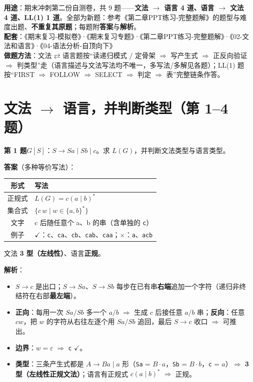 \documentclass[12pt,a4paper,fontset=windows]{ctexart}
\newcommand{\ok}{\ensuremath{\checkmark}}
\newcommand{\bad}{\ensuremath{\times}}
\newcommand{\imp}{\ensuremath{\Rightarrow}}
\begin{document}
\begin{infobox}
\textbf{用途}：期末冲刺第二份自测卷，共 9 题——\textbf{文法 $\to$ 语言 4 道、语言 $\to$ 文法 4 道、LL(1) 1 道}。全部为新题：参考《第二章PPT练习-完整题解》的题型与难度出题、\textbf{不重复其原题}；每题附\textbf{答案}与\textbf{解析}。\\
\textbf{配套}：《期末复习-模拟卷》·《期末复习专题》·《第二章PPT练习-完整题解》·《02-文法和语言》·《04-语法分析-自顶向下》\\
\textbf{做题方法}：文法$\rightleftarrows$语言题按``读递归模式 / 定骨架 \imp{} 写产生式 \imp{} 正反向验证 \imp{} 判类型''走（语言描述与文法写法均不唯一，多写法/多解见各题）；LL(1) 题按``FIRST \imp{} FOLLOW \imp{} SELECT \imp{} 判定 \imp{} 表''完整链条作答。
\end{infobox}

\section{\texorpdfstring{文法 $\to$ 语言，并判断类型（第 1--4 题）}{文法→语言，并判断类型（第 1–4 题）}}

\begin{qbox}
{\large\bfseries 第 1 题}\quad $G[S]$：$S \to Sa \mid Sb \mid c$。求 $L(G)$，并判断文法类型与语言类型。
\end{qbox}

\textbf{答案}（多种等价写法）：

\begin{center}
\renewcommand{\arraystretch}{1.25}
\begin{tabular}{c p{11.2cm}}
\toprule
\textbf{形式} & \textbf{写法} \\
\midrule
正规式 & $L(G)=c(a \mid b)^*$ \\
集合式 & $\{c\,w \mid w \in \{a,b\}^*\}$ \\
文字 & c 后随任意个 a、b 的串（含单独的 \texttt{c}） \\
例子 & \ok：\texttt{c}、\texttt{ca}、\texttt{cb}、\texttt{cab}、\texttt{caa}；\bad：\texttt{a}、\texttt{acb} \\
\bottomrule
\end{tabular}
\end{center}

文法 \textbf{3 型（左线性）}、语言\textbf{正规}。

\textbf{解析}：
\begin{itemize}
\item $S \to c$ 是出口；$S \to Sa$、$S \to Sb$ 每步在已有串\textbf{右端}追加一个字符（递归非终结符在右部\textbf{最左端}）。
\item \textbf{正向}：每用一次 $Sa/Sb$ 多一个 $a/b$ \imp{} 生成 $c$ 后接任意 $a/b$ 串；\textbf{反向}：任意 $c w$，把 $w$ 的字符从右往左逐个用 $Sa/Sb$ 追回，最后 $S \to c$ 收口 \imp{} 可推出。
\item \textbf{边界}：$w = \varepsilon$ \imp{} \texttt{c} \ok。
\item \textbf{类型}：三条产生式都是 $A \to Ba \mid a$ 形（\texttt{Sa} = $B \cdot a$，\texttt{Sb} = $B \cdot b$，\texttt{c} = $a$）\imp{} \textbf{3 型（左线性正规文法）}；语言有正规式 $c(a \mid b)^*$ \imp{} 正规。
\end{itemize}
\end{document}

